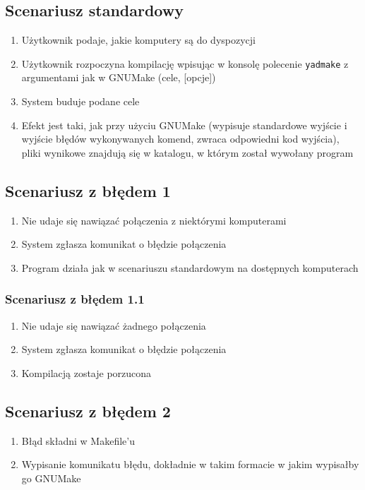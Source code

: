 \documentclass[a4paper]{article}
\begin{document}
\subsection{Scenariusz standardowy}

\begin{enumerate}
	\item Użytkownik podaje, jakie komputery są do dyspozycji
	\item Użytkownik rozpoczyna kompilację wpisując w konsolę polecenie \verb+yadmake+ z argumentami jak w GNUMake (cele, [opcje]) 
	\item System buduje podane cele
	\item Efekt jest taki, jak przy użyciu GNUMake (wypisuje standardowe wyjście i wyjście błędów wykonywanych komend, zwraca odpowiedni kod wyjścia), pliki wynikowe znajdują się w katalogu, w którym został wywołany program
\end{enumerate}


\subsection{Scenariusz z błędem 1}

\begin{enumerate}
	\item Nie udaje się nawiązać połączenia z niektórymi komputerami
	\item System zgłasza komunikat o błędzie połączenia
	\item Program działa jak w scenariuszu standardowym na dostępnych komputerach
\end{enumerate}


\subsubsection{Scenariusz z błędem 1.1}

\begin{enumerate}
	\item Nie udaje się nawiązać żadnego połączenia
	\item System zgłasza komunikat o błędzie połączenia
	\item Kompilacją zostaje porzucona
\end{enumerate}


\subsection{Scenariusz z błędem 2}

\begin{enumerate}
	\item Błąd składni w Makefile’u
	\item Wypisanie komunikatu błędu, dokładnie w takim formacie w jakim wypisałby go GNUMake
\end{enumerate}
\end{document}
